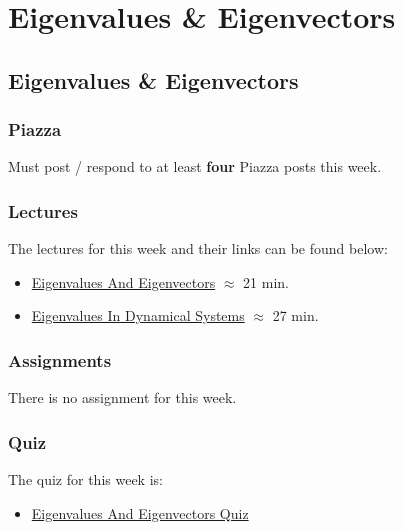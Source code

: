\clearpage

\renewcommand{\ChapTitle}{Eigenvalues \& Eigenvectors}
\renewcommand{\SectionTitle}{Eigenvalues \& Eigenvectors}

\chapter{\ChapTitle}
\section{\SectionTitle}

\subsection{Piazza}

Must post / respond to at least \textbf{four} Piazza posts this week.

\subsection{Lectures}

The lectures for this week and their links can be found below:

\begin{itemize}
    \item \href{https://applied.cs.colorado.edu/mod/hvp/view.php?id=50826}{Eigenvalues And Eigenvectors} $\approx$ 21 min.
    \item \href{https://applied.cs.colorado.edu/mod/hvp/view.php?id=50827}{Eigenvalues In Dynamical Systems} $\approx$ 27 min.
\end{itemize}

\subsection{Assignments}

There is no assignment for this week.

\subsection{Quiz}

The quiz for this week is:

\begin{itemize}
    \item \href{https://applied.cs.colorado.edu/mod/quiz/view.php?id=52237}{Eigenvalues And Eigenvectors Quiz}
\end{itemize}